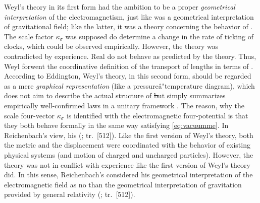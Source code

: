 \documentclass[submitted]{article}
\renewcommand{\rzlp}[2]{(\cite[#1]{Reichenbach1928}; tr.\ #2)\xspace}
\renewcommand{\rzlap}[2]{(\cite[#1]{Reichenbach1928}; tr.\ [#2])\xspace}
\begin{document}
Weyl's theory in its first form had the ambition to be a proper \emph{geometrical interpretation} of the electromagnetism, just like \gr was a geometrical interpretation of gravitational field; like the latter, it was a theory concerning the behavior of \rac. The scale factor $\kappa_\sigma$ was supposed do determine a change in the rate of ticking of clocks, which could be observed empirically. However, the theory was contradicted by experience. Real \rac do not behave as predicted by the theory. Thus, Weyl forwent the coordinative definition of the transport of lengths in terms of \rac. According to Eddington, Weyl's theory, in this second form, should be regarded as a mere \emph{graphical representation} (like a pressureâ"temperature diagram), which does not aim to describe the actual structure of \st but simply summarizes empirically well-confirmed laws in a unitary framework \citep[see][\S8.3]{Ryckman2005}. The reason, why the scale four-vector $\kappa_\sigma$ is identified with the electromagnetic four-potential is that they both behave formally in the same way satisfying \cref{eq:vacuumme}. In Reichenbach's view, his  \rzlap{365}{512}. Like the first version of Weyl's theory, both the metric and the displacement were coordinated with the behavior of existing physical systems (\rac and motion of charged and uncharged particles). However, the theory was not in conflict with experience like the first version of Weyl's theory did. In this sense, Reichenbach's considered his geometrical interpretation of the electromagnetic field as no  than the geometrical interpretation of gravitation provided by general relativity \rzlap{366}{512}.

\end{document}
